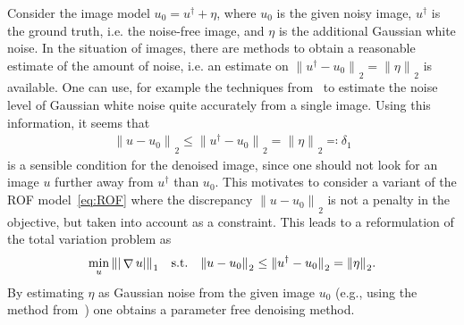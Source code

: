 \documentclass[twocolumn,envcountsame]{svjour3}
\newcommand{\norm}[2][]{{\|{#2}\|_{}}_{#1}}
\newcommand{\abs}[1]{|#1|}
\newcommand{\udag}{u^{\dagger}}
\newcommand{\subjectto}{\text{\quad s.t.\quad }}
\DeclareMathOperator{\grad}{\nabla}
\begin{document}
Consider the image model $u_0 = \udag + \eta$, where $u_0$ is the 
given noisy image, $\udag$ is the ground truth, i.e. the noise-free 
image, and $\eta$ is the additional Gaussian white noise.
In the situation of images, there are methods to obtain a reasonable estimate of the amount of noise, i.e. an estimate on $\norm[2]{\udag - u_{0}} = \norm[2]{\eta}$ is available.
One can use, for example the techniques from~\cite{liu2012noise,liu2013single} to estimate the noise level of Gaussian white noise quite accurately from a single image.
Using this information, it seems that 
\begin{align*}
	\norm[2]{u-u_0}\leq \norm[2]{\udag -u_0} = \norm[2]{\eta}
	\eqqcolon \delta_1
\end{align*}
is a sensible condition for the denoised image, since one should not look for an image $u$ further
away from $\udag$ than $u_{0}$. 
This motivates to consider a variant of the ROF model~\eqref{eq:ROF} where the discrepancy $\norm[2]{u-u_{0}}$ is not a penalty in the objective, but taken into account as a constraint.
This leads to a reformulation of the total variation problem as
\begin{align*}
	\min_u \norm[1]{\abs{\grad u}}\subjectto\norm[2]{u-u_0}
	\leq \norm[2]{\udag - u_0} = \norm[2]{\eta}.
\end{align*}
By estimating $\eta$ as Gaussian noise from the given image $u_{0}$ (e.g., using the method from~\cite{liu2012noise,liu2013single}) one obtains a parameter free denoising method.
\end{document}

